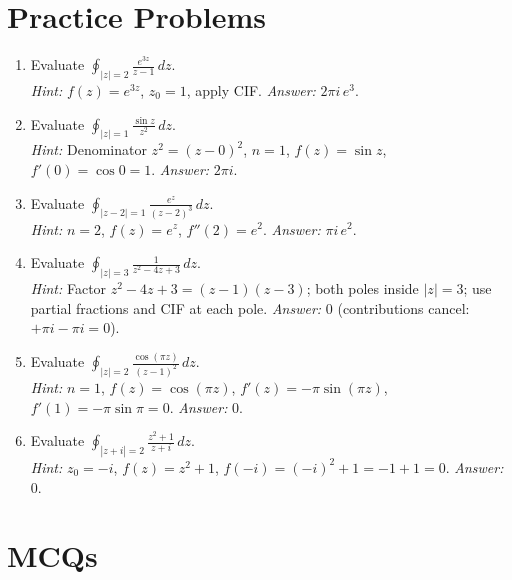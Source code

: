 \documentclass[12pt,a4paper]{article}
\begin{document}
\section{Practice Problems}

\begin{enumerate}[label=\textbf{P\arabic*.}, leftmargin=*]

  \item Evaluate $\displaystyle\oint_{|z|=2} \frac{e^{3z}}{z - 1}\,dz$. \\
  \textit{Hint:} $f(z)=e^{3z}$, $z_0=1$, apply CIF. \textit{Answer:} $2\pi i\,e^3$.

  \item Evaluate $\displaystyle\oint_{|z|=1} \frac{\sin z}{z^2}\,dz$. \\
  \textit{Hint:} Denominator $z^2 = (z-0)^2$, $n=1$, $f(z)=\sin z$, $f'(0)=\cos 0 = 1$.
  \textit{Answer:} $2\pi i$.

  \item Evaluate $\displaystyle\oint_{|z-2|=1} \frac{e^z}{(z-2)^3}\,dz$. \\
  \textit{Hint:} $n=2$, $f(z)=e^z$, $f''(2)=e^2$.
  \textit{Answer:} $\pi i\,e^2$.

  \item Evaluate $\displaystyle\oint_{|z|=3} \frac{1}{z^2 - 4z + 3}\,dz$. \\
  \textit{Hint:} Factor $z^2-4z+3 = (z-1)(z-3)$; both poles inside $|z|=3$;
  use partial fractions and CIF at each pole.
  \textit{Answer:} $0$ (contributions cancel: $+\pi i - \pi i = 0$).

  \item Evaluate $\displaystyle\oint_{|z|=2} \frac{\cos(\pi z)}{(z-1)^2}\,dz$. \\
  \textit{Hint:} $n=1$, $f(z)=\cos(\pi z)$, $f'(z)=-\pi\sin(\pi z)$,
  $f'(1)=-\pi\sin\pi = 0$.
  \textit{Answer:} $0$.

  \item Evaluate $\displaystyle\oint_{|z+i|=2} \frac{z^2+1}{z+i}\,dz$. \\
  \textit{Hint:} $z_0 = -i$, $f(z)=z^2+1$, $f(-i)=(-i)^2+1 = -1+1 = 0$.
  \textit{Answer:} $0$.

\end{enumerate}

\section{MCQs}
\end{document}
